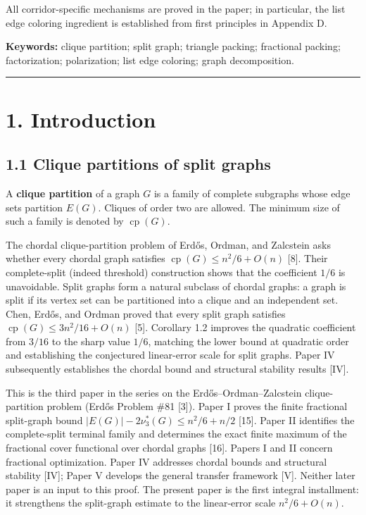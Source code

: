 \documentclass[english,11pt,a4paper]{article}
\begin{document}
All corridor-specific mechanisms are proved in the paper; in particular,
the list edge coloring ingredient is established from first principles
in Appendix D.

\textbf{Keywords:} clique partition; split graph; triangle packing;
fractional packing; factorization; polarization; list edge coloring;
graph decomposition.

\begin{center}\rule{0.5\linewidth}{0.5pt}\end{center}

\section{1. Introduction}\label{introduction}

\subsection{1.1 Clique partitions of split
graphs}\label{clique-partitions-of-split-graphs}

A \textbf{clique partition} of a graph \(G\) is a family of complete
subgraphs whose edge sets partition \(E(G)\). Cliques of order two are
allowed. The minimum size of such a family is denoted by
\(\operatorname{cp}(G)\).

The chordal clique-partition problem of Erdős, Ordman, and Zalcstein
asks whether every chordal graph satisfies
\(\operatorname{cp}(G)\le n^2/6+O(n)\) {[}8{]}. Their complete-split
(indeed threshold) construction shows that the coefficient \(1/6\) is
unavoidable. Split graphs form a natural subclass of chordal graphs: a
graph is split if its vertex set can be partitioned into a clique and an
independent set. Chen, Erdős, and Ordman proved that every split graph
satisfies \(\operatorname{cp}(G)\le 3n^2/16+O(n)\) {[}5{]}. Corollary
1.2 improves the quadratic coefficient from \(3/16\) to the sharp value
\(1/6\), matching the lower bound at quadratic order and establishing
the conjectured linear-error scale for split graphs. Paper IV
subsequently establishes the chordal bound and structural stability
results {[}IV{]}.

This is the third paper in the series on the Erdős--Ordman--Zalcstein
clique-partition problem (Erdős Problem \#81 {[}3{]}). Paper I proves
the finite fractional split-graph bound
\(|E(G)|-2\nu_3^*(G)\le n^2/6+n/2\) {[}15{]}. Paper II identifies the
complete-split terminal family and determines the exact finite maximum
of the fractional cover functional over chordal graphs {[}16{]}. Papers
I and II concern fractional optimization. Paper IV addresses chordal
bounds and structural stability {[}IV{]}; Paper V develops the general
transfer framework {[}V{]}. Neither later paper is an input to this
proof. The present paper is the first integral installment: it
strengthens the split-graph estimate to the linear-error scale
\(n^2/6+O(n)\).
\end{document}
